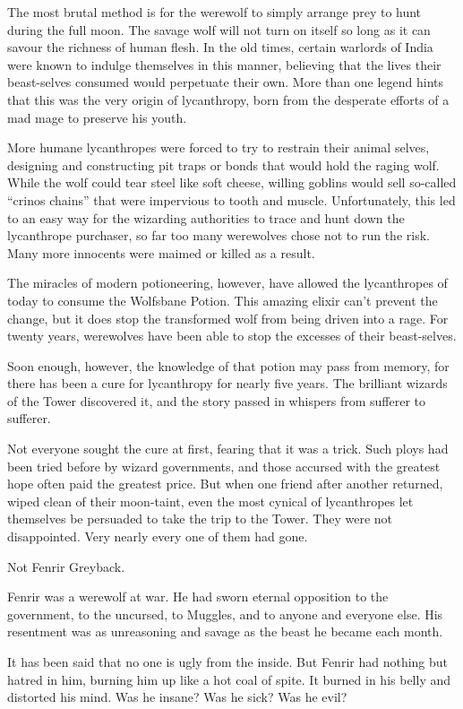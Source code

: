 The most brutal method is for the werewolf to simply arrange prey to
hunt during the full moon. The savage wolf will not turn on itself so
long as it can savour the richness of human flesh. In the old times,
certain warlords of India were known to indulge themselves in this
manner, believing that the lives their beast-selves consumed would
perpetuate their own. More than one legend hints that this was the very
origin of lycanthropy, born from the desperate efforts of a mad mage to
preserve his youth.

More humane lycanthropes were forced to try to restrain their animal
selves, designing and constructing pit traps or bonds that would hold
the raging wolf. While the wolf could tear steel like soft cheese,
willing goblins would sell so-called ``crinos chains'' that were
impervious to tooth and muscle. Unfortunately, this led to an easy way
for the wizarding authorities to trace and hunt down the lycanthrope
purchaser, so far too many werewolves chose not to run the risk. Many
more innocents were maimed or killed as a result.

The miracles of modern potioneering, however, have allowed the
lycanthropes of today to consume the Wolfsbane Potion. This amazing
elixir can't prevent the change, but it does stop the transformed wolf
from being driven into a rage. For twenty years, werewolves have been
able to stop the excesses of their beast-selves.

Soon enough, however, the knowledge of that potion may pass from memory,
for there has been a cure for lycanthropy for nearly five years. The
brilliant wizards of the Tower discovered it, and the story passed in
whispers from sufferer to sufferer.

Not everyone sought the cure at first, fearing that it was a trick. Such
ploys had been tried before by wizard governments, and those accursed
with the greatest hope often paid the greatest price. But when one
friend after another returned, wiped clean of their moon-taint, even the
most cynical of lycanthropes let themselves be persuaded to take the
trip to the Tower. They were not disappointed. Very nearly every one of
them had gone.

Not Fenrir Greyback.

Fenrir was a werewolf at war. He had sworn eternal opposition to the
government, to the uncursed, to Muggles, and to anyone and everyone
else. His resentment was as unreasoning and savage as the beast he
became each month.

It has been said that no one is ugly from the inside. But Fenrir had
nothing but hatred in him, burning him up like a hot coal of spite. It
burned in his belly and distorted his mind. Was he insane? Was he sick?
Was he evil?

